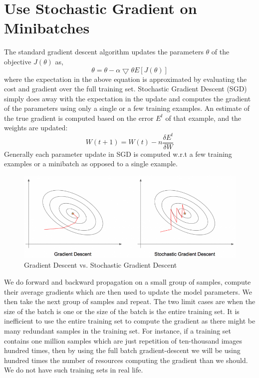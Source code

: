 \section{Use Stochastic Gradient on Minibatches}
The standard gradient descent algorithm updates the parameters $θ$ of the objective $J(θ)$ as, 
\begin{equation}
    \theta = \theta - \alpha\bigtriangledown\theta E [J(\theta)]
\end{equation}
where the expectation in the above equation is approximated by evaluating the cost and gradient over the full training set. Stochastic Gradient Descent (SGD) simply does away with the expectation in the update and computes the gradient of the parameters using only a single or a few training examples. An estimate of the true gradient is computed based on the error $E^t$ of that example, and the weights are updated: 
\begin{equation}
    W(t+1) = W(t) - n\dfrac{\delta E^t}{\delta W}
\end{equation}
Generally each parameter update in SGD is computed w.r.t a few training examples or a minibatch as opposed to a single example. 

\begin{figure}[ht]
\centering
\includegraphics[width=120mm]{lectures/02-b/Stochastic.png}
\caption{Gradient Descent vs. Stochastic Gradient Descent}
\label{fig:sgd}
\end{figure}
We do forward and backward propagation on a small group of samples, compute their average gradients which are then used to update the model parameters. We then take the next group of samples and repeat. The two limit cases are when the size of the batch is one or the size of the batch is the entire training set. It is inefficient to use the entire training set to compute the gradient as there might be many redundant samples in the training set. For instance, if a training set contains one million samples which are just repetition of ten-thousand images hundred times, then by using the full batch gradient-descent we will be using hundred times the number of resources computing the gradient than we should. We do not have such training sets in real life.\\ 

